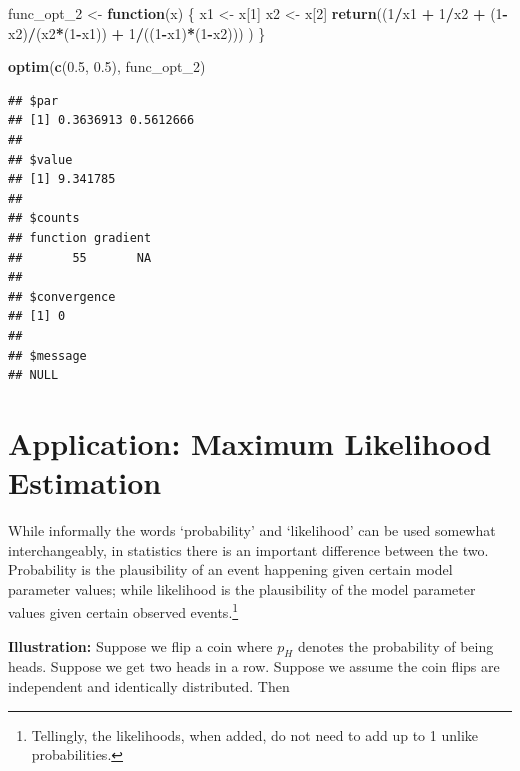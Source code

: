 \documentclass[11pt,]{article}
\newenvironment{Shaded}{\begin{snugshade}}{\end{snugshade}}
\newcommand{\KeywordTok}[1]{\textcolor[rgb]{0.13,0.29,0.53}{\textbf{#1}}}
\newcommand{\DecValTok}[1]{\textcolor[rgb]{0.00,0.00,0.81}{#1}}
\newcommand{\FloatTok}[1]{\textcolor[rgb]{0.00,0.00,0.81}{#1}}
\newcommand{\StringTok}[1]{\textcolor[rgb]{0.31,0.60,0.02}{#1}}
\newcommand{\ControlFlowTok}[1]{\textcolor[rgb]{0.13,0.29,0.53}{\textbf{#1}}}
\newcommand{\OperatorTok}[1]{\textcolor[rgb]{0.81,0.36,0.00}{\textbf{#1}}}
\newcommand{\NormalTok}[1]{#1}
\let\rmarkdownfootnote\footnote%
\def\footnote{\protect\rmarkdownfootnote}
\begin{document}
\begin{Shaded}
\begin{Highlighting}[]
\NormalTok{func_opt_}\DecValTok{2}\NormalTok{ <-}\StringTok{ }\ControlFlowTok{function}\NormalTok{(x)}
\NormalTok{\{}
\NormalTok{  x1 <-}\StringTok{ }\NormalTok{x[}\DecValTok{1}\NormalTok{]}
\NormalTok{  x2 <-}\StringTok{ }\NormalTok{x[}\DecValTok{2}\NormalTok{]}
  \KeywordTok{return}\NormalTok{((}\DecValTok{1}\OperatorTok{/}\NormalTok{x1 }\OperatorTok{+}\StringTok{ }\DecValTok{1}\OperatorTok{/}\NormalTok{x2 }\OperatorTok{+}\StringTok{ }
\StringTok{            }\NormalTok{(}\DecValTok{1}\OperatorTok{-}\NormalTok{x2)}\OperatorTok{/}\NormalTok{(x2}\OperatorTok{*}\NormalTok{(}\DecValTok{1}\OperatorTok{-}\NormalTok{x1)) }\OperatorTok{+}\StringTok{ }
\StringTok{            }\DecValTok{1}\OperatorTok{/}\NormalTok{((}\DecValTok{1}\OperatorTok{-}\NormalTok{x1)}\OperatorTok{*}\NormalTok{(}\DecValTok{1}\OperatorTok{-}\NormalTok{x2)))}
\NormalTok{         )}
\NormalTok{\}}

\KeywordTok{optim}\NormalTok{(}\KeywordTok{c}\NormalTok{(}\FloatTok{0.5}\NormalTok{, }\FloatTok{0.5}\NormalTok{), func_opt_}\DecValTok{2}\NormalTok{)}
\end{Highlighting}
\end{Shaded}

\begin{verbatim}
## $par
## [1] 0.3636913 0.5612666
## 
## $value
## [1] 9.341785
## 
## $counts
## function gradient 
##       55       NA 
## 
## $convergence
## [1] 0
## 
## $message
## NULL
\end{verbatim}

\section{Application: Maximum Likelihood
Estimation}\label{application-maximum-likelihood-estimation}

While informally the words `probability' and `likelihood' can be used
somewhat interchangeably, in statistics there is an important difference
between the two. Probability is the plausibility of an event happening
given certain model parameter values; while likelihood is the
plausibility of the model parameter values given certain observed
events.\footnote{Tellingly, the likelihoods, when added, do not need to
  add up to 1 unlike probabilities.}

\textbf{Illustration:} Suppose we flip a coin where \(p_H\) denotes the
probability of being heads. Suppose we get two heads in a row. Suppose
we assume the coin flips are independent and identically distributed.
Then
\end{document}
